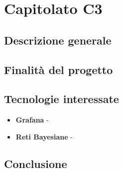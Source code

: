 \chapter{Capitolato C3}
\section{Descrizione generale}

\section{Finalit\`a del progetto}

\section{Tecnologie interessate}
\begin{itemize}
	\item \textbf{Grafana} -
	\item \textbf{Reti Bayesiane} - 
\end{itemize}
\section{Conclusione}

